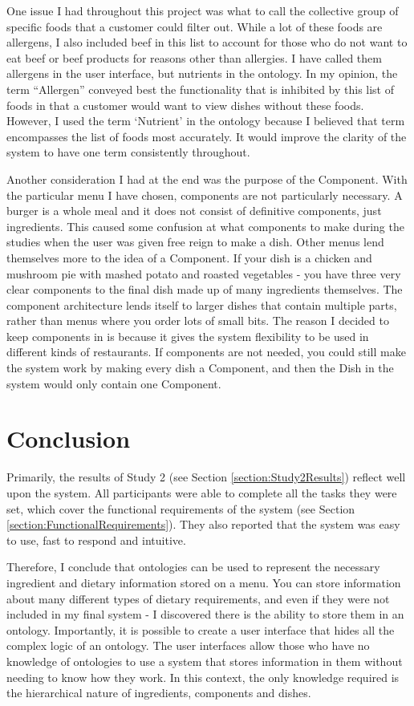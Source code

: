 One issue I had throughout this project was what to call the collective group of specific foods that a customer could filter out. While a lot of these foods are allergens, I also included beef in this list to account for those who do not want to eat beef or beef products for reasons other than allergies. I have called them allergens in the user interface, but nutrients in the ontology. In my opinion, the term ``Allergen'' conveyed best the functionality that is inhibited by this list of foods in that a customer would want to view dishes without these foods. However, I used the term `Nutrient' in the ontology because I believed that term encompasses the list of foods most accurately. It would improve the clarity of the system to have one term consistently throughout. 

Another consideration I had at the end was the purpose of the Component. With the particular menu I have chosen, components are not particularly necessary. A burger is a whole meal and it does not consist of definitive components, just ingredients. This caused some confusion at what components to make during the studies when the user was given free reign to make a dish. Other menus lend themselves more to the idea of a Component. If your dish is a chicken and mushroom pie with mashed potato and roasted vegetables - you have three very clear components to the final dish made up of many ingredients themselves. The component architecture lends itself to larger dishes that contain multiple parts, rather than menus where you order lots of small bits. The reason I decided to keep components in is because it gives the system flexibility to be used in different kinds of restaurants. If components are not needed, you could still make the system work by making every dish a Component, and then the Dish in the system would only contain one Component.


\section{Conclusion}

Primarily, the results of Study 2 (see Section \ref{section:Study2Results}) reflect well upon the system. All participants were able to complete all the tasks they were set, which cover the functional requirements of the system (see Section \ref{section:FunctionalRequirements}). They also reported that the system was easy to use, fast to respond and intuitive.

Therefore, I conclude that ontologies can be used to represent the necessary ingredient and dietary information stored on a menu. You can store information about many different types of dietary requirements, and even if they were not included in my final system - I discovered there is the ability to store them in an ontology. Importantly, it is possible to create a user interface that hides all the complex logic of an ontology. The user interfaces allow those who have no knowledge of ontologies to use a system that stores information in them without needing to know how they work. In this context, the only knowledge required is the hierarchical nature of ingredients, components and dishes.

